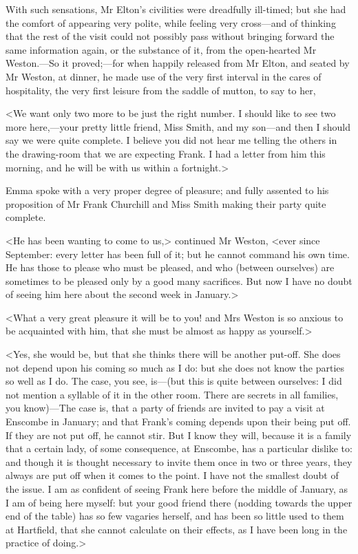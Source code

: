 With such sensations, Mr Elton's civilities were dreadfully ill-timed; but she had the comfort of appearing very polite, while feeling very cross—and of thinking that the rest of the visit could not possibly pass without bringing forward the same information again, or the substance of it, from the open-hearted Mr Weston.—So it proved;—for when happily released from Mr Elton, and seated by Mr Weston, at dinner, he made use of the very first interval in the cares of hospitality, the very first leisure from the saddle of mutton, to say to her,

<We want only two more to be just the right number. I should like to see two more here,—your pretty little friend, Miss Smith, and my son—and then I should say we were quite complete. I believe you did not hear me telling the others in the drawing-room that we are expecting Frank. I had a letter from him this morning, and he will be with us within a fortnight.>

Emma spoke with a very proper degree of pleasure; and fully assented to his proposition of Mr Frank Churchill and Miss Smith making their party quite complete.

<He has been wanting to come to us,> continued Mr Weston, <ever since September: every letter has been full of it; but he cannot command his own time. He has those to please who must be pleased, and who (between ourselves) are sometimes to be pleased only by a good many sacrifices. But now I have no doubt of seeing him here about the second week in January.>

<What a very great pleasure it will be to you! and Mrs Weston is so anxious to be acquainted with him, that she must be almost as happy as yourself.>

<Yes, she would be, but that she thinks there will be another put-off. She does not depend upon his coming so much as I do: but she does not know the parties so well as I do. The case, you see, is—(but this is quite between ourselves: I did not mention a syllable of it in the other room. There are secrets in all families, you know)—The case is, that a party of friends are invited to pay a visit at Enscombe in January; and that Frank's coming depends upon their being put off. If they are not put off, he cannot stir. But I know they will, because it is a family that a certain lady, of some consequence, at Enscombe, has a particular dislike to: and though it is thought necessary to invite them once in two or three years, they always are put off when it comes to the point. I have not the smallest doubt of the issue. I am as confident of seeing Frank here before the middle of January, as I am of being here myself: but your good friend there (nodding towards the upper end of the table) has so few vagaries herself, and has been so little used to them at Hartfield, that she cannot calculate on their effects, as I have been long in the practice of doing.>

